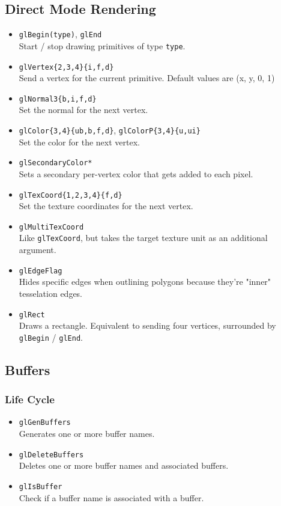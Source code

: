 \documentclass[12pt]{article}
\begin{document}
\subsection{Direct Mode Rendering}
\begin{itemize}
\item \texttt{glBegin(type)}, \texttt{glEnd} \\
	Start / stop drawing primitives of type \texttt{type}.
\item \texttt{glVertex\{2,3,4\}\{i,f,d\}} \\
	Send a vertex for the current primitive. Default values are (x, y, 0, 1)
\item \texttt{glNormal3\{b,i,f,d\}} \\
	Set the normal for the next vertex.
\item \texttt{glColor\{3,4\}\{ub,b,f,d\}}, \texttt{glColorP\{3,4\}\{u,ui\}} \\
	Set the color for the next vertex.
\item \texttt{glSecondaryColor*} \\
	Sets a secondary per-vertex color that gets added to each pixel.
\item \texttt{glTexCoord\{1,2,3,4\}\{f,d\}} \\
	Set the texture coordinates for the next vertex.
\item \texttt{glMultiTexCoord} \\
	Like \texttt{glTexCoord}, but takes the target texture unit as an additional argument.
\item \texttt{glEdgeFlag} \\
	Hides specific edges when outlining polygons because they're "inner" tesselation edges.
\item \texttt{glRect} \\
	Draws a rectangle. Equivalent to sending four vertices, surrounded by \texttt{glBegin} / \texttt{glEnd}.
\end{itemize}



\subsection{Buffers}

\subsubsection{Life Cycle}
\begin{itemize}
\item \texttt{glGenBuffers} \\
	Generates one or more buffer names.
\item \texttt{glDeleteBuffers} \\
	Deletes one or more buffer names and associated buffers.
\item \texttt{glIsBuffer} \\
	Check if a buffer name is associated with a buffer.
\end{itemize}
\end{document}
